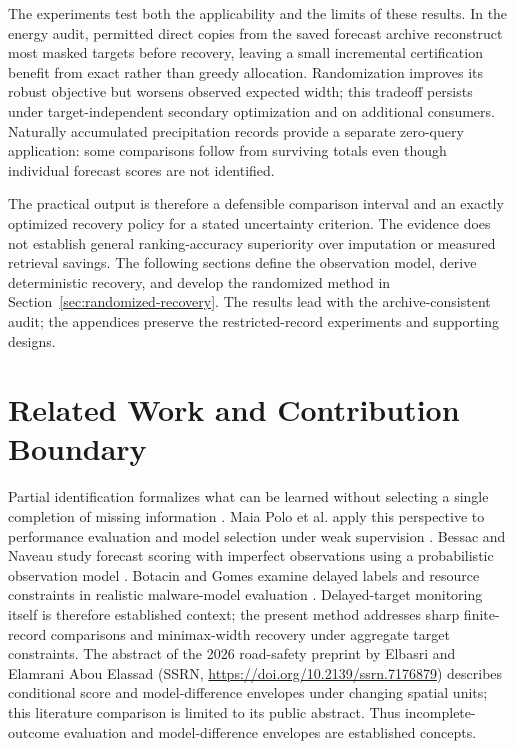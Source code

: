 \documentclass[12pt]{article}
\begin{document}
The experiments test both the applicability and the limits of these results.
In the energy audit, permitted direct copies from the saved forecast archive
reconstruct most masked targets before recovery, leaving a small incremental
certification benefit from exact rather than greedy allocation. Randomization
improves its robust objective but worsens observed expected width; this
tradeoff persists under target-independent secondary optimization and on
additional consumers. Naturally accumulated precipitation records provide
a separate zero-query application: some comparisons follow from surviving
totals even though individual forecast scores are not identified.

The practical output is therefore a defensible comparison interval and an
exactly optimized recovery policy for a stated uncertainty criterion.
The evidence does not establish general ranking-accuracy superiority over
imputation or measured retrieval savings. The following sections define the
observation model, derive deterministic recovery, and develop the randomized
method in Section~\ref{sec:randomized-recovery}. The results lead with the
archive-consistent audit; the appendices preserve the restricted-record
experiments and supporting designs.

\section{Related Work and Contribution Boundary}
Partial identification formalizes what can be learned without selecting a
single completion of missing information \cite{manski}. Maia Polo et al.
apply this perspective to performance evaluation and model selection under
weak supervision \cite{polo}. Bessac and Naveau study forecast scoring with
imperfect observations using a probabilistic observation model \cite{bessac}.
Botacin and Gomes examine delayed labels and resource constraints in
realistic malware-model evaluation \cite{botacin2025}. Delayed-target
monitoring itself is therefore established context; the present method
addresses sharp finite-record comparisons and minimax-width recovery under
aggregate target constraints.
The abstract of the 2026 road-safety preprint by Elbasri and Elamrani Abou
Elassad (SSRN, \url{https://doi.org/10.2139/ssrn.7176879}) describes
conditional score and model-difference envelopes under changing spatial
units; this literature comparison is limited to its public abstract.
Thus incomplete-outcome evaluation and model-difference
envelopes are established concepts.
\end{document}

